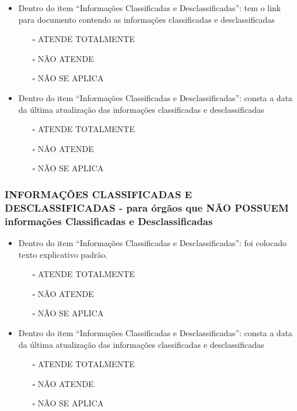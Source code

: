 \documentclass[
]{book}
\providecommand{\tightlist}{%
  \setlength{\itemsep}{0pt}\setlength{\parskip}{0pt}}
\begin{document}
\begin{itemize}
\tightlist
\item
  Dentro do item ``Informações Classificadas e Desclassificadas'': tem o link para documento contendo as informações classificadas e desclassificadas

  \begin{itemize}
  \tightlist
  \item[$\square$]
    ATENDE TOTALMENTE
  \item[$\square$]
    NÃO ATENDE
  \item[$\square$]
    NÃO SE APLICA
  \end{itemize}
\item
  Dentro do item ``Informações Classificadas e Desclassificadas'': consta a data da última atualização das informações classificadas e desclassificadas

  \begin{itemize}
  \tightlist
  \item[$\square$]
    ATENDE TOTALMENTE
  \item[$\square$]
    NÃO ATENDE
  \item[$\square$]
    NÃO SE APLICA
  \end{itemize}
\end{itemize}

\hypertarget{informauxe7uxf5es-classificadas-e-desclassificadas---para-uxf3rguxe3os-que-nuxe3o-possuem-informauxe7uxf5es-classificadas-e-desclassificadas}{%
\subsubsection*{INFORMAÇÕES CLASSIFICADAS E DESCLASSIFICADAS - para órgãos que NÃO POSSUEM informações Classificadas e Desclassificadas}\label{informauxe7uxf5es-classificadas-e-desclassificadas---para-uxf3rguxe3os-que-nuxe3o-possuem-informauxe7uxf5es-classificadas-e-desclassificadas}}

\begin{itemize}
\tightlist
\item
  Dentro do item ``Informações Classificadas e Desclassificadas'': foi colocado texto explicativo padrão.

  \begin{itemize}
  \tightlist
  \item[$\square$]
    ATENDE TOTALMENTE
  \item[$\square$]
    NÃO ATENDE
  \item[$\square$]
    NÃO SE APLICA
  \end{itemize}
\item
  Dentro do item ``Informações Classificadas e Desclassificadas'': consta a data da última atualização das informações classificadas e desclassificadas

  \begin{itemize}
  \tightlist
  \item[$\square$]
    ATENDE TOTALMENTE
  \item[$\square$]
    NÃO ATENDE
  \item[$\square$]
    NÃO SE APLICA
  \end{itemize}
\end{itemize}
\end{document}
